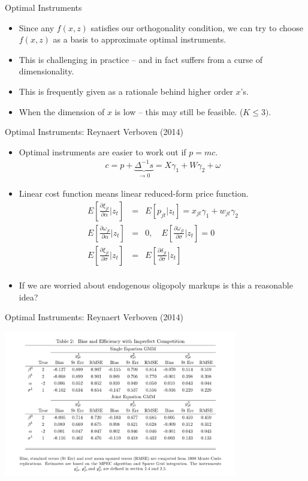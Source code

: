 \documentclass[xcolor=pdftex,dvipsnames,table,mathserif]{beamer}
\begin{document}
\begin{frame}{Optimal Instruments}
\begin{itemize}
\item Since any $f(x,z)$ satisfies our orthogonality condition, we can try to choose $f(x,z)$ as a \alert{basis} to approximate optimal instruments.
\item This is challenging in practice -- and in fact suffers from a curse of dimensionality.
\item This is frequently given as a rationale behind higher order $x$'s.
\item When the dimension of $x$ is low -- this may still be feasible. ($K \leq 3)$.
\end{itemize}
\end{frame}

\begin{frame}{Optimal Instruments: Reynaert Verboven (2014)}
\begin{itemize}
\footnotesize
\item Optimal instruments are easier to work out if $p = mc$.
\begin{eqnarray*}
c = p  + \underbrace{\Delta^{-1} s}_{\rightarrow 0}  = X \gamma_1 + W \gamma_2 + \omega
\end{eqnarray*}
\item Linear cost function means linear reduced-form price function.
\begin{eqnarray*}
E\left[ \frac{\partial \xi_{jt} }{\partial \alpha} | z_t \right] &=& E[p_{jt} | z_t] = x_{jt} \gamma_1 + w_{jt} \gamma_2\\
E\left[ \frac{\partial \omega_{jt} }{\partial \alpha} | z_t \right] &=& 0 , \quad E\left[ \frac{\partial \omega_{jt} }{\partial \sigma} | z_t \right] = 0\\
E\left[ \frac{\partial \xi_{jt} }{\partial \sigma} | z_t \right] &=&E\left[ \frac{\partial \delta_{jt} }{\partial \sigma} | z_t \right]\\
\end{eqnarray*}
\item If we are worried about endogenous oligopoly markups is this a reasonable idea?
\end{itemize}
\end{frame}

\begin{frame}{Optimal Instruments: Reynaert Verboven (2014)}
\begin{center}
\includegraphics[width=4in]{resources/verboven.png}
\end{center}
\end{frame}
\end{document}
